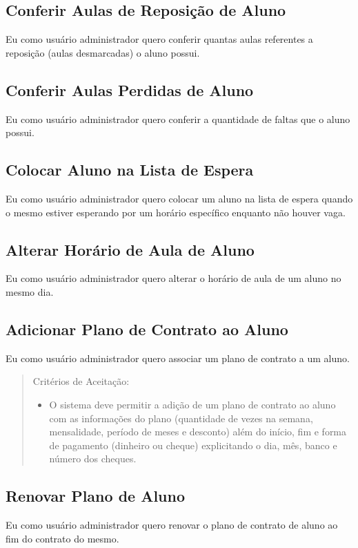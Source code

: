 \subsection[Conferir Aulas de Reposição de Aluno]{Conferir Aulas de Reposição de Aluno}
Eu como usuário administrador quero conferir quantas aulas referentes a
reposição (aulas desmarcadas) o aluno possui.

\subsection[Conferir Aulas Perdidas de Aluno]{Conferir Aulas Perdidas de Aluno}
Eu como usuário administrador quero conferir a quantidade de faltas que o aluno
possui.

\subsection[Colocar Aluno na Lista de Espera]{Colocar Aluno na Lista de Espera}
Eu como usuário administrador quero colocar um aluno na lista de espera quando o
mesmo estiver esperando por um horário específico enquanto não houver vaga.

\subsection[Alterar Horário de Aula de Aluno]{Alterar Horário de Aula de Aluno}
Eu como usuário administrador quero alterar o horário de aula de um aluno no
mesmo dia.

\subsection[Adicionar Plano de Contrato ao Aluno]{Adicionar Plano de Contrato ao Aluno}
Eu como usuário administrador quero associar um plano de contrato a um aluno.

\begin{quote}
Critérios de Aceitação:
    \begin{itemize}
        \item O sistema deve permitir a adição de um plano de contrato ao aluno com as informações do plano (quantidade de vezes na semana, mensalidade, período de meses e desconto) além do início, fim e forma de pagamento (dinheiro ou cheque) explicitando o dia, mês, banco e número dos cheques.
    \end{itemize}
\end{quote} 

\subsection[Renovar Plano de Aluno]{Renovar Plano de Aluno}
Eu como usuário administrador quero renovar o plano de contrato de aluno ao fim do contrato do mesmo.

